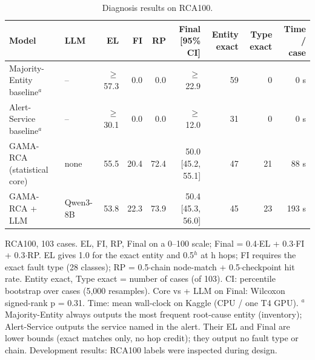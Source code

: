 \begin{table}[t]
\centering\small
\caption{Diagnosis results on RCA100.}\label{tab:main}
\begin{tabular}{llrrrrrrr}
\toprule
Model & LLM & EL & FI & RP & Final [95\% CI] & Entity exact & Type exact & Time / case \\
\midrule
Majority-Entity baseline$^a$ & -- & $\geq$ 57.3 & 0.0 & 0.0 & $\geq$ 22.9 & 59 & 0 & 0 s \\
Alert-Service baseline$^a$ & -- & $\geq$ 30.1 & 0.0 & 0.0 & $\geq$ 12.0 & 31 & 0 & 0 s \\
GAMA-RCA (statistical core) & none & 55.5 & 20.4 & 72.4 & 50.0 [45.2, 55.1] & 47 & 21 & 88 s \\
GAMA-RCA + LLM & Qwen3-8B & 53.8 & 22.3 & 73.9 & 50.4 [45.3, 56.0] & 45 & 23 & 193 s \\
\bottomrule
\end{tabular}
\par\smallskip\footnotesize RCA100, 103 cases. EL, FI, RP, Final on a 0--100 scale; Final = 0.4$\cdot$EL + 0.3$\cdot$FI + 0.3$\cdot$RP. EL gives 1.0 for the exact entity and 0.5$^h$ at h hops; FI requires the exact fault type (28 classes); RP = 0.5$\cdot$chain node-match + 0.5$\cdot$checkpoint hit rate. Entity exact, Type exact = number of cases (of 103). CI: percentile bootstrap over cases (5,000 resamples). Core vs + LLM on Final: Wilcoxon signed-rank p = 0.31. Time: mean wall-clock on Kaggle (CPU / one T4 GPU). $^a$ Majority-Entity always outputs the most frequent root-cause entity (inventory); Alert-Service outputs the service named in the alert. Their EL and Final are lower bounds (exact matches only, no hop credit); they output no fault type or chain. Development results: RCA100 labels were inspected during design.
\end{table}